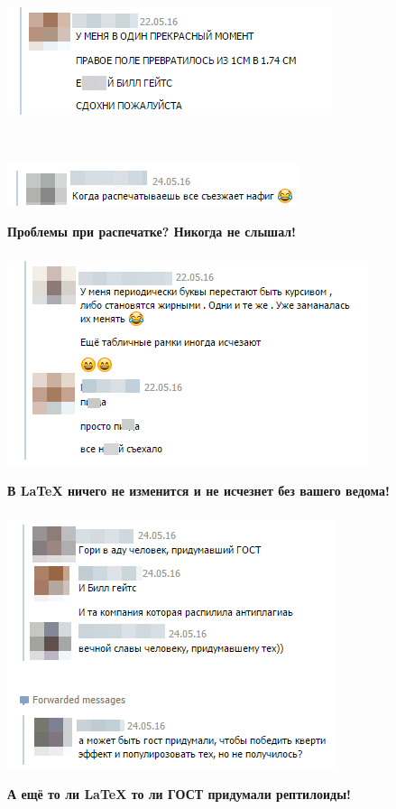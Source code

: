 \documentclass[newPxFont]{beamer}
\begin{document}
\begin{frame}
\frametitle{\insertsection} 
    \centering
    \includegraphics[scale=0.5]{m7.png}

	\mbox{ }     
     
    \includegraphics[scale=0.6]{m9.png}
    
    \vfill
    \alert{\textbf{Проблемы при распечатке? Никогда не слышал!}}
\end{frame}


\begin{frame}
\frametitle{\insertsection} 
    \centering
    \includegraphics[scale=0.5]{m8.png}
    
    \vfill
    \alert{\textbf{В \LaTeX{} ничего не изменится и не исчезнет без вашего ведома!}}
\end{frame}


\begin{frame}
\frametitle{\insertsection} 
    \centering
    \includegraphics[scale=0.5]{m10.png}
    
    \vfill
    \alert{\textbf{А ещё то ли \LaTeX{} то ли ГОСТ придумали рептилоиды!}}
\end{frame}
\end{document}
